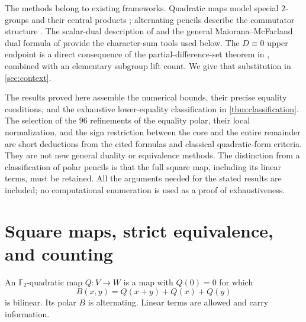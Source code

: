 \documentclass[11pt,a4paper]{article}
\theoremstyle{definition}
\theoremstyle{remark}
\numberwithin{equation}{section}
\newcommand{\F}{\mathbb F}
\begin{document}
The methods belong to existing frameworks. Quadratic maps model special
\(2\)-groups and their central products \citep{KK12,KK15}; alternating
pencils describe the commutator structure \citep{LM18,PFMR14,MPG13}.
The scalar-dual description of \citep[Theorem 2.1,
pp.~509--510]{AFH24} and the general Maiorana--McFarland dual formula of
\citep[equation (4), p.~313]{CMP18} provide the character-sum tools used
below. The \(D\equiv0\) upper endpoint is a direct consequence of the
partial-difference-set theorem in \citep[Theorem 6]{WFW23}, combined with
an elementary subgroup lift count. We give that substitution in
\cref{sec:context}.

The results proved here assemble the numerical bounds, their precise
equality conditions, and the exhaustive lower-equality classification
in \cref{thm:classification}. The selection of the \(96\) refinements of
the equality polar, their local normalization, and the sign restriction
between the core and the entire remainder are short deductions from
the cited formulas and classical quadratic-form criteria. They are not
new general duality or equivalence methods. The distinction from a
classification of polar pencils is that the full square map, including
its linear terms, must be retained. All the arguments needed for the
stated results are included; no computational enumeration is used as a
proof of exhaustiveness.

\section{Square maps, strict equivalence, and counting}\label{sec:prelim}
An \(\F_2\)-quadratic map \(Q:V\to W\) is a map with \(Q(0)=0\) for
which
\[
 B(x,y)=Q(x+y)+Q(x)+Q(y)
\]
is bilinear. Its polar \(B\) is alternating. Linear terms are allowed
and carry information.
\end{document}
